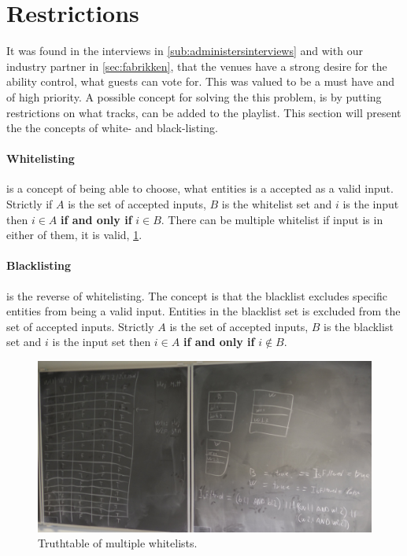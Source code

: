 \section{Restrictions}
\label{sec:restrictions}

It was found in the interviews in \cref{sub:administersinterviews} and with our industry partner in \cref{sec:fabrikken}, that the venues have a strong desire for the ability control, what guests can vote for. This was valued to be a must have and of high priority. A possible concept for solving the this problem, is by putting restrictions on what tracks, can be added to the playlist. This section will present the the concepts of white- and black-listing.

\paragraph{Whitelisting} is a concept of being able to choose, what entities is a accepted as a valid input. Strictly if $A$ is the set of accepted inputs, $B$ is the whitelist set and $i$ is the input then $i \in A$ \textbf{if and only if} $i \in B$. There can be multiple whitelist if input is in either of them, it is valid, \cref{fig:restrictions}.

\paragraph{Blacklisting} is the reverse of whitelisting. The concept is that the blacklist excludes specific entities from being a valid input. Entities in the blacklist set is excluded from the set of accepted inputs. Strictly $A$ is the set of accepted inputs, $B$ is the blacklist set and $i$ is the input set then $i \in A$ \textbf{if and only if} $i \notin B$.


\begin{figure}[H]
  \centering
  \includegraphics[width=1.2\linewidth]{Images/restriction.jpg}
  \caption{Truthtable of multiple whitelists.}\label{fig:restrictions}
\end{figure}

